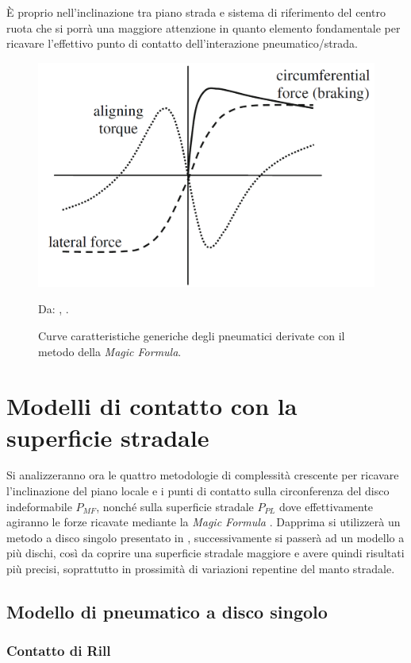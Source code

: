 È proprio nell'inclinazione tra piano strada e sistema di riferimento del centro ruota che si porrà una maggiore attenzione in quanto elemento fondamentale per ricavare l'effettivo punto di contatto dell'interazione pneumatico/strada.
%
\begin{figure}[h]
	\centering
	\includegraphics[width=0.58\linewidth]{Figures/pacejka}
	\caption{Curve caratteristiche generiche degli pneumatici derivate con il metodo della \textit{Magic Formula}.}
	Da: \citeauthor{Schramm}, .
	\label{pacejka}
\end{figure}
%
\section{Modelli di contatto con la superficie stradale}
%
Si analizzeranno ora le quattro metodologie di complessità crescente per ricavare l'inclinazione del piano locale e i punti di contatto sulla circonferenza del disco indeformabile $P_{MF}$, nonché sulla superficie stradale $P_{PL}$ dove effettivamente agiranno le forze ricavate mediante la \textit{Magic Formula} \cite{hans}. Dapprima si utilizzerà un metodo a disco singolo presentato in \cite{Rill}, successivamente si passerà ad un modello a più dischi, così da coprire una superficie stradale maggiore e avere quindi risultati più precisi, soprattutto in prossimità di variazioni repentine del manto stradale.


%
\subsection{Modello di pneumatico a disco singolo}
%
\subsubsection{Contatto di Rill}
\label{Contatto_Rill}
%
